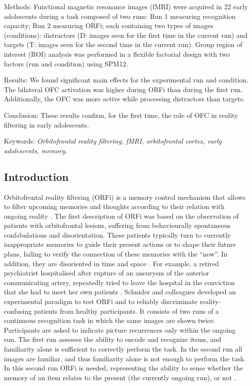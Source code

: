 Methods: Functional magnetic resonance images (fMRI) were acquired in 22 early adolescents during a task composed of two runs: Run 1 measuring recognition capacity; Run 2 measuring ORFi; each containing two types of images (conditions): distractors (D: images seen for the first time in the current run) and targets (T: images seen for the second time in the current run). Group region of interest (ROI) analysis was performed in a flexible factorial design with two factors (run and condition) using SPM12. 

Results: We found significant main effects for the experimental run and condition. The bilateral OFC activation was higher during ORFi than during the first run. Additionally, the OFC was more active while processing distractors than targets. 

Conclusion: These results confirm, for the first time, the role of OFC in reality filtering in early adolescents.

Keywords: \textit{Orbitofrontal reality filtering, fMRI, orbitofrontal cortex, early adolescents, memory.}

\subsection{Introduction}

Orbitofrontal reality filtering (ORFi) is a memory control mechanism that allows to filter upcoming memories and thoughts according to their relation with ongoing reality \citep{Schnider2013,Schnider2018}. The first description of ORFi was based on the observation of patients with orbitofrontal lesions, suffering from behaviourally spontaneous confabulations and disorientation. These patients typically turn to currently inappropriate memories to guide their present actions or to shape their future plans, failing to verify the connection of these memories with the “now”. In addition, they are disoriented in time and space \citep{Schnider2018}.  For example, a retired psychiatrist hospitalised after rupture of an aneurysm of the anterior communicating artery, repeatedly tried to leave the hospital in the conviction that she had to meet her own patients \citep{Schnider2005}. 
Schnider and colleagues \citep{Schnider1996} developed an experimental paradigm to test ORFi and to reliably discriminate reality-confusing patients from healthy participants. It consists of two runs of a continuous recognition task in which the same images are shown twice. Participants are asked to indicate picture recurrences only within the ongoing run. The first run assesses the ability to encode and recognize items, and familiarity alone is sufficient to correctly perform the task. In the second run all images are familiar, and thus familiarity alone is not enough to perform the task. In this second run ORFi is needed, representing the ability to sense whether the memory of an item relates to the present (the currently ongoing run), or not \citep{Schnider1999}. 

